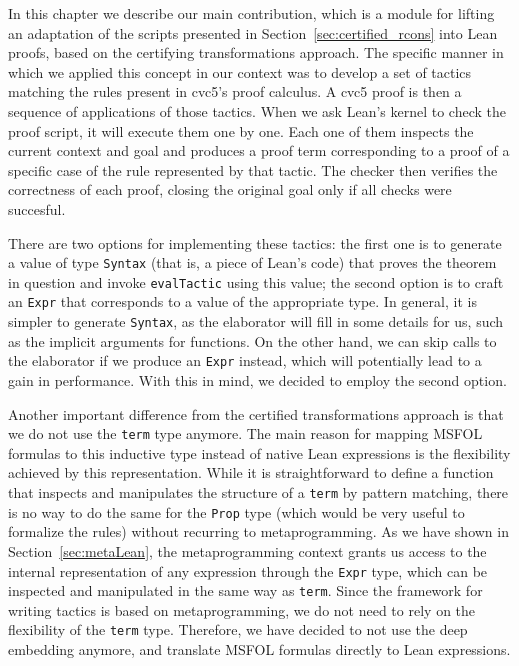 In this chapter we describe our main contribution, which is a module
for lifting an adaptation of the scripts presented in Section~\ref{sec:certified_rcons} into
Lean proofs, based on the certifying transformations approach.
%
The specific manner in which we applied
this concept in our context was to develop a set of tactics matching
the rules present in cvc5's proof calculus.
A cvc5 proof is then a sequence of applications of those tactics.
When we ask Lean's kernel to check the proof script, it will execute them
one by one. Each one of them inspects the current context and goal
and produces a proof term corresponding to a proof of a specific
case of the rule represented by that tactic.
The checker then verifies the correctness of each proof, closing the original goal only
if all checks were succesful.

There are two options for implementing these tactics: the first one is to generate
a value of type \texttt{Syntax} (that is, a piece of Lean's code) that proves
the theorem in question and invoke \texttt{evalTactic} using this value;
the second option is to craft an \texttt{Expr} that corresponds to a value
of the appropriate type. In general,
it is simpler to generate \texttt{Syntax}, as the elaborator will fill in
some details for us, such as the implicit arguments for functions. On the
other hand, we can skip calls to the elaborator if we produce an \texttt{Expr}
instead, which will potentially lead to a gain in performance. With this in mind,
we decided to employ the second option.

Another important difference from the certified transformations approach is that
we do not use the \texttt{term} type anymore.
%
The main reason for mapping MSFOL formulas to this inductive type instead of
native Lean expressions is the flexibility achieved by this representation.
%
While it is straightforward to define a function that inspects and manipulates
the structure of a \texttt{term} by pattern matching, there is no way to do the
same for the \texttt{Prop} type (which would be very useful to formalize the
rules) without recurring to metaprogramming.
%
As we have shown in Section~\ref{sec:metaLean}, the metaprogramming context
grants us access to the internal representation of any expression through the
\texttt{Expr} type, which can be inspected and manipulated in the same way
as \texttt{term}. Since the framework for writing tactics is based on
metaprogramming, we do not need to rely on the flexibility of the \texttt{term}
type.
%
Therefore, we have decided to not use the deep embedding anymore, and
translate MSFOL formulas directly to Lean expressions.

